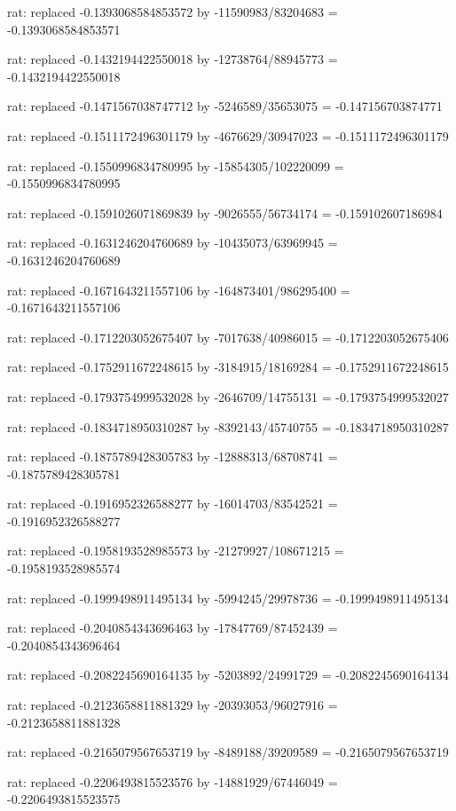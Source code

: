 \documentclass[a4paper,10pt]{article}
\begin{document}
\begin{eulernotebook}
\begin{eulercomment}
\begin{eulercomment}
\begin{eulercomment}
\begin{eulercomment}
\begin{eulercomment}
\begin{eulercomment}
\begin{eulercomment}
\begin{eulercomment}
\begin{eulercomment}
\begin{eulercomment}
\begin{eulercomment}
\begin{eulercomment}
\begin{eulercomment}
\begin{eulercomment}
\begin{eulercomment}
\begin{eulercomment}
\begin{euleroutput}
  rat: replaced -0.1393068584853572 by -11590983/83204683 = -0.1393068584853571
  
  rat: replaced -0.1432194422550018 by -12738764/88945773 = -0.1432194422550018
  
  rat: replaced -0.1471567038747712 by -5246589/35653075 = -0.147156703874771
  
  rat: replaced -0.1511172496301179 by -4676629/30947023 = -0.1511172496301179
  
  rat: replaced -0.1550996834780995 by -15854305/102220099 = -0.1550996834780995
  
  rat: replaced -0.1591026071869839 by -9026555/56734174 = -0.159102607186984
  
  rat: replaced -0.1631246204760689 by -10435073/63969945 = -0.1631246204760689
  
  rat: replaced -0.1671643211557106 by -164873401/986295400 = -0.1671643211557106
  
  rat: replaced -0.1712203052675407 by -7017638/40986015 = -0.1712203052675406
  
  rat: replaced -0.1752911672248615 by -3184915/18169284 = -0.1752911672248615
  
  rat: replaced -0.1793754999532028 by -2646709/14755131 = -0.1793754999532027
  
  rat: replaced -0.1834718950310287 by -8392143/45740755 = -0.1834718950310287
  
  rat: replaced -0.1875789428305783 by -12888313/68708741 = -0.1875789428305781
  
  rat: replaced -0.1916952326588277 by -16014703/83542521 = -0.1916952326588277
  
  rat: replaced -0.1958193528985573 by -21279927/108671215 = -0.1958193528985574
  
  rat: replaced -0.1999498911495134 by -5994245/29978736 = -0.1999498911495134
  
  rat: replaced -0.2040854343696463 by -17847769/87452439 = -0.2040854343696464
  
  rat: replaced -0.2082245690164135 by -5203892/24991729 = -0.2082245690164134
  
  rat: replaced -0.2123658811881329 by -20393053/96027916 = -0.2123658811881328
  
  rat: replaced -0.2165079567653719 by -8489188/39209589 = -0.2165079567653719
  
  rat: replaced -0.2206493815523576 by -14881929/67446049 = -0.2206493815523575
  

\end{euleroutput}
\end{eulercomment}
\end{eulercomment}
\end{eulercomment}
\end{eulercomment}
\end{eulercomment}
\end{eulercomment}
\end{eulercomment}
\end{eulercomment}
\end{eulercomment}
\end{eulercomment}
\end{eulercomment}
\end{eulercomment}
\end{eulercomment}
\end{eulercomment}
\end{eulercomment}
\end{eulercomment}
\end{eulernotebook}
\end{document}
